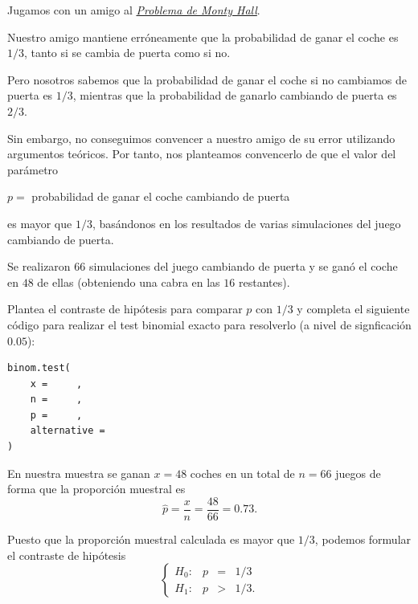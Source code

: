 \documentclass[
  notoc,
  nobib,
  degree=mec]{mnye}
\begin{document}
\begin{ex}

Jugamos con un amigo al \href{https://www.mathwarehouse.com/monty-hall-simulation-online/}{\emph{Problema de Monty Hall}}.

Nuestro amigo mantiene erróneamente que la probabilidad de ganar el coche es \(1/3\), tanto si se cambia de puerta como si no.

Pero nosotros sabemos que la probabilidad de ganar el coche si no cambiamos de puerta es \(1/3\), mientras que la probabilidad de ganarlo cambiando de puerta es \(2/3\).

Sin embargo, no conseguimos convencer a nuestro amigo de su error utilizando argumentos teóricos. Por tanto, nos planteamos convencerlo de que el valor del parámetro

\begin{center}
\(p =\)
probabilidad de ganar el coche cambiando de puerta

\end{center}

es mayor que \(1/3\), basándonos en los resultados de varias simulaciones del juego cambiando de puerta.

Se realizaron \(66\) simulaciones del juego cambiando de puerta y se ganó el coche en \(48\) de ellas (obteniendo una cabra en las \(16\) restantes).

\begin{parts}

\item

Plantea el contraste de hipótesis para comparar \(p\) con \(1/3\) y completa el siguiente código para realizar el test binomial exacto para resolverlo (a nivel de signficación \(0.05\)):

\begin{verbatim}
binom.test(
    x =     ,
    n =     ,
    p =     ,
    alternative =
)
\end{verbatim}

\begin{sol}

En nuestra muestra se ganan \(x=48\) coches en un total de \(n=66\) juegos de forma que la proporción muestral es
\[
\hat p = \frac{x}{n} = \frac{48}{66}  = 0.73.
\]

Puesto que la proporción muestral calculada es mayor que \(1/3\), podemos formular el contraste de hipótesis
\[
  \left\{
  \begin{array}{lrcl}
    H_0:&p&=&1/3\\
    H_1:&p&>&1/3.
  \end{array}
  \right.
\]


\end{sol}
\end{parts}
\end{ex}
\end{document}
